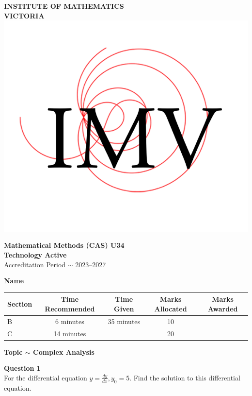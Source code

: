 \documentclass[a4paper,12pt]{article}
\begin{document}
\pagestyle{fancy}
\renewcommand{\headrulewidth}{0pt}  %
\fancyfoot[C]{}
\fancyfoot[R]{\thepage}

\begin{center}
    \vspace{0.2cm}
    
    \Huge \textbf{INSTITUTE OF MATHEMATICS \\ VICTORIA} \\
    \vspace{0.2cm}
    \includegraphics[width=0.2\linewidth]{IMV yt.png}
    \vspace{0.2cm}
    
    \LARGE \textbf{Mathematical Methods (CAS) U34} \\
    \vspace{0.2cm}
    \LARGE \textbf{Technology Active} \\
    \vspace{0.2cm}
    \Large Accreditation Period $\sim$ 2023--2027 \\
    \vspace{1cm}
    
    \normalsize \textbf{Name \_\_\_\_\_\_\_\_\_\_\_\_\_\_\_\_\_\_\_\_\_\_} \\
    \vspace{1cm}
    
    \begin{tabular}{|l|c|c|c|c|}
        \hline
        \textbf{Section} & \textbf{Time Recommended} & \textbf{Time Given} & \textbf{Marks Allocated} & \textbf{Marks Awarded} \\
        \hline
        B & 6 minutes & 35 minutes & 10 & \\
        \hline
        C & 14 minutes & & 20 & \\
        \hline
    \end{tabular}
    
    \vspace{1cm}
    \LARGE \textbf{Topic $\sim$ Complex Analysis}
\end{center}
\vspace{1cm}
\noindent \textbf{Question 1} \\[0.3cm]
For the differential equation \( y = \frac{dy}{dx}, y_0 = 5 \). Find the solution to this differential equation. \\[0.3cm]
\end{document}
